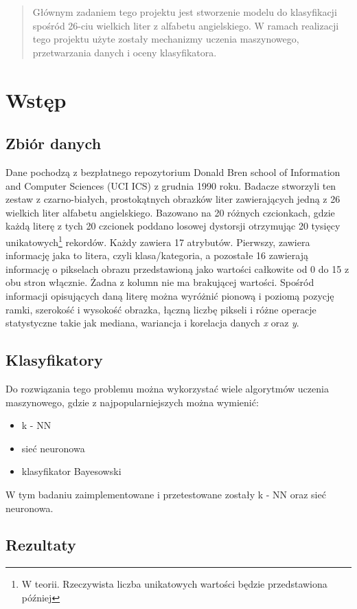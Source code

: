 \begin{abstract}
    Głównym zadaniem tego projektu jest stworzenie modelu do klasyfikacji spośród 26-ciu wielkich liter z alfabetu angielskiego.
    W ramach realizacji tego projektu użyte zostały mechanizmy uczenia maszynowego, przetwarzania danych i oceny klasyfikatora.
\end{abstract}

\section{Wstęp}\label{sec:wstep}

\subsection{Zbiór danych}\label{subsec:zbiordanych}
Dane pochodzą z bezpłatnego repozytorium \cite{misc_letter_recognition_59} Donald Bren school of Information and Computer Sciences (UCI ICS) z grudnia 1990 roku.
Badacze stworzyli ten zestaw z czarno-białych, prostokątnych obrazków liter zawierających jedną z 26 wielkich liter alfabetu angielskiego.
Bazowano na 20 różnych czcionkach, gdzie każdą literę z tych 20 czcionek poddano losowej dystorsji otrzymując 20 tysięcy 
unikatowych\footnote{W teorii. Rzeczywista liczba unikatowych wartości będzie przedstawiona później} rekordów.
Każdy zawiera 17 atrybutów. Pierwszy, zawiera informację jaka to litera, czyli klasa/kategoria, a pozostałe 16 zawierają informację o pikselach obrazu przedstawioną jako wartości całkowite od 0 do 15 z obu stron włącznie.
Żadna z kolumn nie ma brakującej wartości. Spośród informacji opisujących daną literę można wyróżnić pionową i poziomą pozycję ramki, szerokość i wysokość obrazka, łączną liczbę pikseli i różne operacje statystyczne
takie jak mediana, wariancja i korelacja danych \textit{x} oraz \textit{y}.

\subsection{Klasyfikatory}\label{subsec:klasyfikatory}
Do rozwiązania tego problemu można wykorzystać wiele algorytmów uczenia maszynowego, gdzie z najpopularniejszych można wymienić:
\begin{itemize}
    \item k - NN
    \item sieć neuronowa
    \item klasyfikator Bayesowski
\end{itemize}
W tym badaniu zaimplementowane i przetestowane zostały k - NN oraz sieć neuronowa.

\subsection{Rezultaty}
